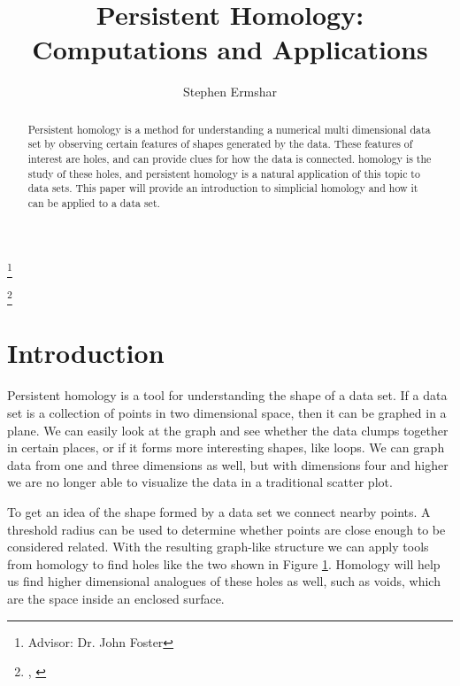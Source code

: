 

\title[Persistent Homology]{Persistent Homology: Computations and Applications}
\author{Stephen Ermshar}
\address{Department of Mathematics, Walla Walla University, College Place, WA 99324}
\date{} %
\thanks{Advisor: Dr. John Foster}

\thanks{\tiny{\DTMtoday, \DTMcurrenttime}}
\rfoot{\hfill\newline\tiny{\DTMtoday, \DTMcurrenttime}}




\begin{abstract}
    Persistent homology is a method for understanding a numerical multi dimensional data set by observing certain features of shapes generated by the data.
    These features of interest are holes, and can provide clues for how the data is connected.
    homology is the study of these holes, and persistent homology is a natural application of this topic to data sets.
    This paper will provide an introduction to simplicial homology and how it can be applied to a data set.
\end{abstract}
\maketitle

\section{Introduction}

Persistent homology is a tool for understanding the shape of a data set.
If a data set is a collection of points in two dimensional space, then it can be graphed in a plane.
We can easily look at the graph and see whether the data clumps together in certain places, or if it forms more interesting shapes, like loops.
We can graph data from one and three dimensions as well, but with dimensions four and higher we are no longer able to visualize the data in a traditional scatter plot.

\begin{figure}[h]
    \centering
    \scalebox{0.75}{}
    \caption{}
    \label{fig:persistence-demo-r25}
\end{figure}

To get an idea of the shape formed by a data set we connect nearby points.
A threshold radius can be used to determine whether points are close enough to be considered related.
With the resulting graph-like structure we can apply tools from homology to find holes like the two shown in Figure \ref{fig:persistence-demo-r25}.
Homology will help us find higher dimensional analogues of these holes as well, such as voids, which are the space inside an enclosed surface.

